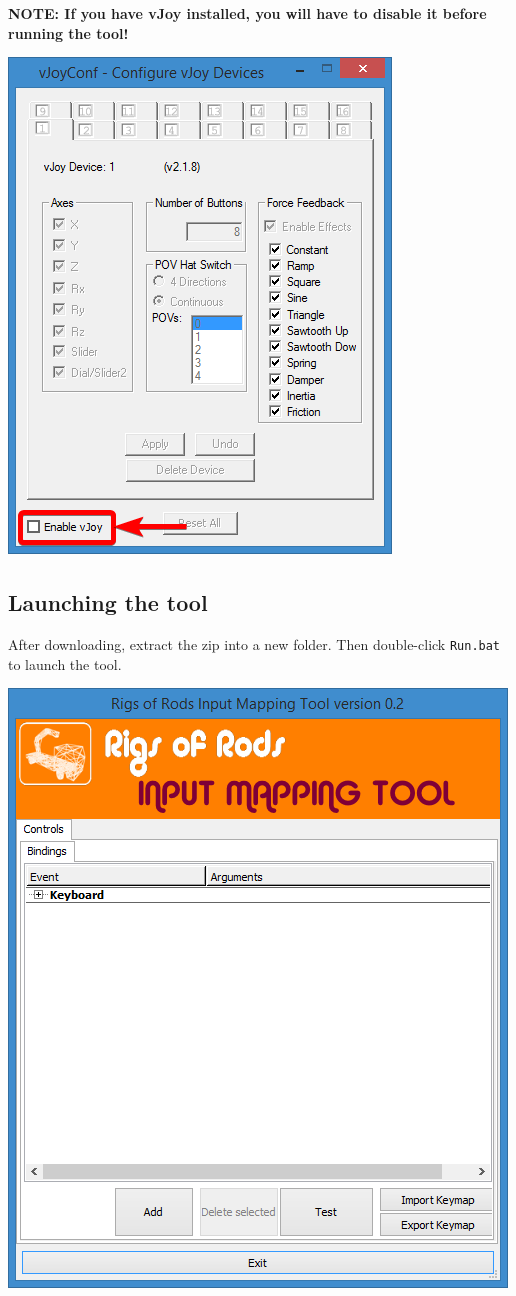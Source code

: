\textbf{NOTE: If you have vJoy installed, you will have to disable it
before running the tool!}

\includegraphics{images/vJoyDisable.png}

\hypertarget{launching-the-tool}{%
\subsection{Launching the tool}\label{launching-the-tool}}

After downloading, extract the zip into a new folder. Then double-click
\texttt{Run.bat} to launch the tool.

\includegraphics{images/InputMappingTool-1.png}

